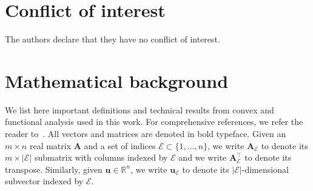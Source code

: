 \documentclass[11pt]{article}
\numberwithin{prop}{section}
\numberwithin{lem}{section}
\numberwithin{rem}{section}
\numberwithin{cor}{section}
\numberwithin{thm}{section}
\numberwithin{defn}{section}
\numberwithin{fact}{section}
\theoremstyle{plain}
\def\bu {\boldsymbol{u}}
\def\R {\mathbb{R}}
\newcommand{\matr}[1]{\bm{#1}}
\def\Rn {\R^n}
\def\eqset {\mathcal{E}}
\def\Atop {\matr{A}^{\top}}
\begin{document}
\section*{Conflict of interest}
The authors declare that they have no conflict of interest.

\appendix
\section{Mathematical background} \label{app:A}
We list here important definitions and technical results from convex and functional analysis used in this work. For comprehensive references, we refer the reader to~\cite{rockafellar1997convex,rockafellar2009variational,aubin2012differential,ekeland1999convex,hiriart2013convexI,hiriart2013convexII}. All vectors and matrices are denoted in bold typeface. Given an $m\times n$ real matrix $\matr{A}$ and a set of indices $\mathcal{E} \subset \{1,\dots,n\}$, we write $\matr{A}_{\eqset}$ to denote its $m\times|\eqset|$ submatrix with columns indexed by $\mathcal{E}$ and we write $\Atop_{\eqset}$ to denote its transpose. Similarly, given $\bu \in \Rn$, we write $\bu_{\eqset}$ to denote its $|\eqset|$-dimensional subvector indexed by $\eqset$. 
\end{document}
